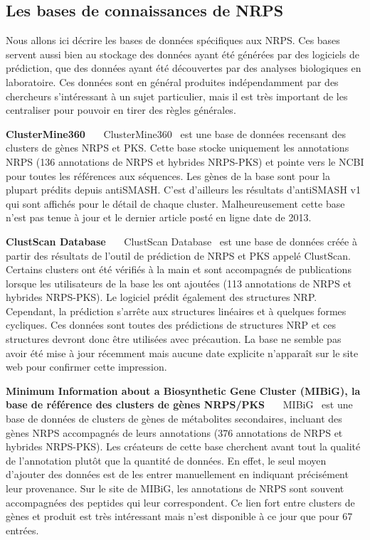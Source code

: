 \subsection{Les bases de connaissances de NRPS}

Nous allons ici décrire les bases de données spécifiques aux NRPS.
Ces bases servent aussi bien au stockage des données ayant été générées par des logiciels de prédiction, que des données ayant été découvertes par des analyses biologiques en laboratoire.
Ces données sont en général produites indépendamment par des chercheurs s'intéressant à un sujet particulier, mais il est très important de les centraliser pour pouvoir en tirer des règles générales.

\textbf{ClusterMine360}~~~
ClusterMine360~\cite{conway_clustermine360:_2013} est une base de données recensant des clusters de gènes NRPS et PKS.
Cette base stocke uniquement les annotations NRPS (136 annotations de NRPS et hybrides NRPS-PKS) et pointe vers le NCBI pour toutes les références aux séquences.
Les gènes de la base sont pour la plupart prédits depuis antiSMASH.
C'est d'ailleurs les résultats d'antiSMASH v1 qui sont affichés pour le détail de chaque cluster.
Malheureusement cette base n'est pas tenue à jour et le dernier article posté en ligne date de 2013.


\textbf{ClustScan Database}~~~
ClustScan Database~\cite{diminic_databases_2013} est une base de données créée à partir des résultats de l'outil de prédiction de NRPS et PKS appelé ClustScan.
Certains clusters ont été vérifiés à la main et sont accompagnés de publications lorsque les utilisateurs de la base les ont ajoutées (113 annotations de NRPS et hybrides NRPS-PKS).
Le logiciel prédit également des structures NRP.
Cependant, la prédiction s'arrête aux structures linéaires et à quelques formes cycliques.
Ces données sont toutes des prédictions de structures NRP et ces structures devront donc être utilisées avec précaution.
La base ne semble pas avoir été mise à jour récemment mais aucune date explicite n’apparaît sur le site web pour confirmer cette impression.


\textbf{Minimum Information about a Biosynthetic Gene Cluster (MIBiG), la base de référence des clusters de gènes NRPS/PKS}~~~
MIBiG~\cite{medema_minimum_2015} est une base de données de clusters de gènes de métabolites secondaires, incluant des gènes NRPS accompagnés de leurs annotations (376 annotations de NRPS et hybrides NRPS-PKS).
Les créateurs de cette base cherchent avant tout la qualité de l'annotation plutôt que la quantité de données.
En effet, le seul moyen d'ajouter des données est de les entrer manuellement en indiquant précisément leur provenance.
Sur le site de MIBiG, les annotations de NRPS sont souvent accompagnées des peptides qui leur correspondent.
Ce lien fort entre clusters de gènes et produit est très intéressant mais n'est disponible à ce jour que pour 67 entrées.



